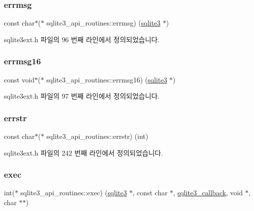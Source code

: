 \subsubsection{\texorpdfstring{errmsg}{errmsg}}
{\footnotesize\ttfamily const char$\ast$($\ast$ sqlite3\+\_\+api\+\_\+routines\+::errmsg) (\hyperlink{sqlite3_8h_a0ef6f2646262c8a9b24368d8ac140f69}{sqlite3} $\ast$)}



sqlite3ext.\+h 파일의 96 번째 라인에서 정의되었습니다.

\mbox{\label{structsqlite3__api__routines_a1392e153c69f5b32fd8acc19cb780baf}} 
\subsubsection{\texorpdfstring{errmsg16}{errmsg16}}
{\footnotesize\ttfamily const void$\ast$($\ast$ sqlite3\+\_\+api\+\_\+routines\+::errmsg16) (\hyperlink{sqlite3_8h_a0ef6f2646262c8a9b24368d8ac140f69}{sqlite3} $\ast$)}



sqlite3ext.\+h 파일의 97 번째 라인에서 정의되었습니다.

\mbox{\label{structsqlite3__api__routines_a853ce95bc126e615a9ba9b30de8fbb62}} 
\subsubsection{\texorpdfstring{errstr}{errstr}}
{\footnotesize\ttfamily const char$\ast$($\ast$ sqlite3\+\_\+api\+\_\+routines\+::errstr) (int)}



sqlite3ext.\+h 파일의 242 번째 라인에서 정의되었습니다.

\mbox{\label{structsqlite3__api__routines_ac6476ec4fd66eb629942bd60a47adf76}} 
\subsubsection{\texorpdfstring{exec}{exec}}
{\footnotesize\ttfamily int($\ast$ sqlite3\+\_\+api\+\_\+routines\+::exec) (\hyperlink{sqlite3_8h_a0ef6f2646262c8a9b24368d8ac140f69}{sqlite3} $\ast$, const char $\ast$, \hyperlink{sqlite3_8h_aede337a366367e94a52d849482967ddd}{sqlite3\+\_\+callback}, void $\ast$, char $\ast$$\ast$)}



